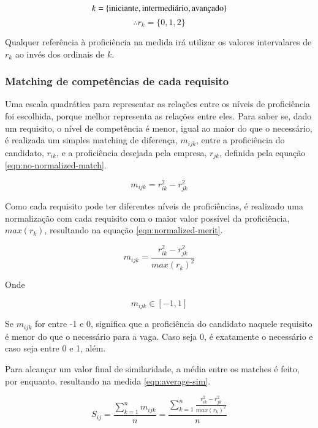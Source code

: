\documentclass[preprint,12pt]{elsarticle}
\begin{document}
$$\\k = \{ \text{iniciante}, \text{intermediário}, \text{avançado} \}$$ 
$$ \therefore r_k = \{ 0, 1, 2 \} $$

Qualquer referência à proficiência na medida irá utilizar os valores intervalares de $r_k$ ao invés dos ordinais de $k$.

\subsubsection{Matching de competências de cada requisito}
\label{sssec:matching}
Uma escala quadrática para representar as relações entre os níveis de proficiência foi escolhida, porque melhor representa as relações entre eles. Para saber se, dado um requisito, o nível de competência é menor, igual ao maior do que o necessário, é realizada um simples matching de diferença, $m_{ijk}$, entre a proficiência do candidato, $r_{ik}$, e a proficiência desejada pela empresa, $r_{jk}$, definida pela equação \ref{eqn:no-normalized-match}.
    
\begin{equation}
\label{eqn:no-normalized-match}
   m_{ijk} = r_{ik}^2 - r_{jk}^2
\end{equation}

Como cada requisito pode ter diferentes níveis de proficiências, é realizado uma normalização com cada requisito com o maior valor possível da proficiência, $max(r_k)$, resultando na equação \ref{eqn:normalized-merit}.
    
\begin{equation}
\label{eqn:normalized-merit}
m_{ijk} = \frac{r_{ik}^2 - r_{jk}^2}{max(r_k)^2}
\end{equation}

Onde

\begin{equation}
m_{ijk} \in [-1, 1]
\end{equation}

Se $m_{ijk}$ for entre -1 e 0, significa que a proficiência do candidato naquele requisito é menor do que o necessário para a vaga. Caso seja 0, é exatamente o necessário e caso seja entre 0 e 1, além.

Para alcançar um valor final de similaridade, a média entre os matches é feito, por enquanto, resultando na medida \ref{eqn:average-sim}.

\begin{equation}
\label{eqn:average-sim}
S_{ij} =  \frac{\sum_{k=1}^n m_{ijk}}
              {n} = 
          \frac{\sum_{k=1}^n \frac{r_{ik}^2 - r_{jk}^2}{max(r_k)^2}}
              {n}
\end{equation}
\end{document}
